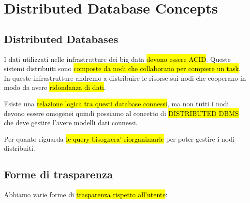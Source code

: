 \newpage
\section{Distributed Database Concepts}

\subsection{Distributed Databases}

I dati utilizzati nelle infrastrutture dei big data \hl{devono essere ACID}. Queste sistemi distribuiti sono \hl{composte da nodi che collaborano per compiere un task}. In queste infrastrutture andremo a distribuire le risorse sui nodi che cooperano in modo da avere \hl{ridondanza di dati}.

Esiste una \hl{relazione logica tra questi database connessi}, ma non tutti i nodi devono essere omogenei quindi possiamo al concetto di \hl{DISTRIBUTED DBMS} che deve gestire l'avere modelli dati connessi. 

Per quanto riguarda \hl{le query bisognera' riorganizzarle} per poter gestire i nodi distribuiti.


\subsection{Forme di trasparenza}

Abbiamo varie forme di \hl{trasparenza rispetto all'utente}:

